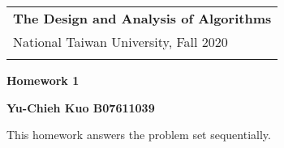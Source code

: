 \documentclass[a4paper,12pt]{article}
\begin{document}
\thispagestyle{empty} %

\begin{tabular}{p{15.5cm}} %
{\large \bf The Design and Analysis of Algorithms} \\
National Taiwan University, Fall 2020  \\
\hline %
\\
\end{tabular} %

\vspace*{0.3cm} %

\begin{center} %
	{\Large \bf Homework 1} %
	\vspace{2mm}
	
	{\bf Yu-Chieh Kuo B07611039} %
		
\end{center}  
\vspace{0.4cm}

This homework answers the problem set sequentially. 
\end{document}
